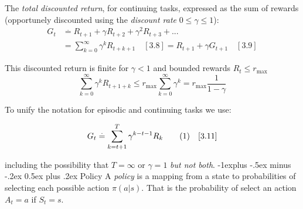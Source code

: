 \documentclass[10pt,landscape]{article}
\makeatletter
\renewcommand{\subsection}{\@startsection{subsection}{2}{0mm}%
                                {-1explus -.5ex minus -.2ex}%
                                {0.5ex plus .2ex}%
                                {\normalfont\normalsize\bfseries}}
\newcommand\numberthis{\addtocounter{equation}{1}\tag{\theequation}}
\makeatother
\begin{document}
\begin{multicols}{3}



The \emph{total discounted return}, for continuing tasks, expressed as the sum of rewards (opportunely discounted using the \emph{discount rate} $0 \le \gamma \le 1$):
\begin{align*}
G_t & \stackrel{.}{=} R_{t+1} + \gamma R_{t+2} + \gamma^2 R_{t+3} + ...\\
& = \sum_{k = 0}^\infty \gamma^k R_{t + k + 1} \quad[3.8] = R_{t+1} + \gamma G_{t+1} \quad[3.9]
\end{align*}

This discounted return is finite for $\gamma < 1$ and bounded rewards $R_t \leq r_{\max}$ $$\sum_{k=0}^\infty \gamma^k R_{t+1+k} \leq r_{\max} \sum_{k=0}^\infty \gamma^k = r_{\max} \frac{1}{1-\gamma}$$

To unify the notation for episodic and continuing tasks we use:

\begin{equation}
G_t \stackrel{.}{=} \sum_{k = t+1}^T \gamma^{k-t-1} R_{k} \numberthis \label{eq:discounted_return_generic} \quad [3.11]
\end{equation}

including the possibility that $T=\infty$ or $\gamma = 1$ \emph{but not both}.
\subsection{Policy}
A \emph{policy} is a mapping from a state to probabilities of selecting each possible action $\pi(a|s)$. That is the probability of select an action $A_t = a$ if $S_t = s$.


\end{multicols}
\end{document}
